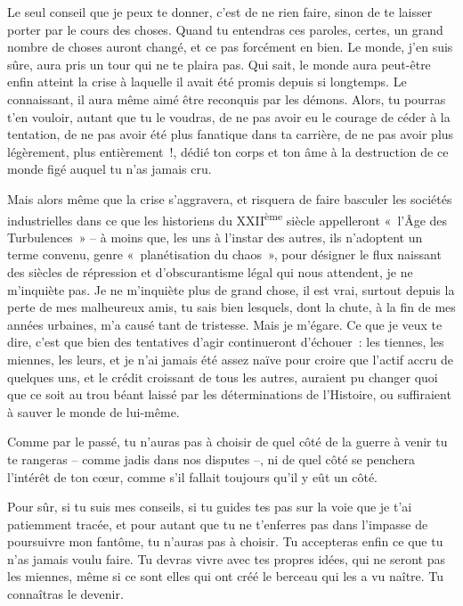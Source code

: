 \documentclass[
  extrafontsizes,
  oneside,
  14pt
]{memoir}
\begin{document}
Le seul conseil que je peux te donner, c'est de ne rien faire, sinon de te
laisser porter par le cours des choses. Quand tu entendras ces paroles, certes,
un grand nombre de choses auront changé, et ce pas forcément en bien. Le monde,
j'en suis sûre, aura pris un tour qui ne te plaira pas. Qui sait, le monde aura
peut-être enfin atteint la crise à laquelle il avait été promis depuis si
longtemps. Le connaissant, il aura même aimé être reconquis par les démons.
Alors, tu pourras t'en vouloir, autant que tu le voudras, de ne pas avoir eu le
courage de céder à la tentation, de ne pas avoir été plus fanatique dans ta
carrière, de ne pas avoir plus légèrement, plus entièrement~!, dédié ton corps
et ton âme à la destruction de ce monde figé auquel tu n'as jamais cru.

Mais alors même que la crise s'aggravera, et risquera de faire basculer les
sociétés industrielles dans ce que les historiens du XXII\textsuperscript{ème}
siècle appelleront «~l'Âge des Turbulences~» -- à moins que, les uns à l'instar
des autres, ils n'adoptent un terme convenu, genre «~planétisation du chaos~»,
pour désigner le flux naissant des siècles de répression et d'obscurantisme
légal qui nous attendent, je ne m'inquiète pas. Je ne m'inquiète plus de grand
chose, il est vrai, surtout depuis la perte de mes malheureux amis, tu sais
bien lesquels, dont la chute, à la fin de mes années urbaines, m'a causé tant
de tristesse. Mais je m'égare. Ce que je veux te dire, c'est que bien des
tentatives d'agir continueront d'échouer~: les tiennes, les miennes, les leurs,
et je n'ai jamais été assez naïve pour croire que l'actif accru de quelques
uns, et le crédit croissant de tous les autres, auraient pu changer quoi que ce
soit au trou béant laissé par les déterminations de l'Histoire, ou suffiraient
à sauver le monde de lui-même.

Comme par le passé, tu n'auras pas à choisir de quel côté de la guerre à venir
tu te rangeras -- comme jadis dans nos disputes --, ni de quel côté se penchera
l'intérêt de ton cœur, comme s'il fallait toujours qu'il y eût un côté.

Pour sûr, si tu suis mes conseils, si tu guides tes pas sur la voie que je t'ai
patiemment tracée, et pour autant que tu ne t'enferres pas dans l'impasse de
poursuivre mon fantôme, tu n'auras pas à choisir. Tu accepteras enfin ce que tu
n'as jamais voulu faire. Tu devras vivre avec tes propres idées, qui ne seront
pas les miennes, même si ce sont elles qui ont créé le berceau qui les a vu
naître. Tu connaîtras le devenir.
\end{document}
